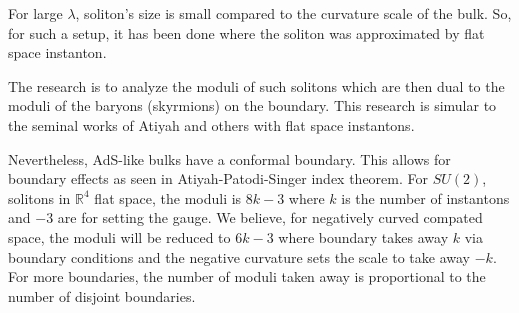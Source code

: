 \documentclass[12pt]{article}
\begin{document}
For large $\lambda$, soliton's size is small compared to the curvature scale of the bulk. 
So, for such a setup, it has been done where the soliton was approximated by flat space instanton.


The research is to analyze the moduli of such solitons which are then dual to the moduli of the baryons (skyrmions) on the boundary.
This research is simular to the seminal works of Atiyah and others with flat space instantons.

Nevertheless, AdS-like bulks have a conformal boundary. 
This allows for boundary effects as seen in Atiyah-Patodi-Singer index theorem.
For $SU(2)$, solitons in $\mathds{R}^4$ flat space, the moduli is $8k - 3$ where $k$ is the number of instantons and $-3$ are for setting the gauge.
We believe, for negatively curved compated space, the moduli will be reduced to $6k - 3$ where boundary takes away $k$ via boundary conditions and the negative curvature sets the scale to take away $-k$.
For more boundaries, the number of moduli taken away is proportional to the number of disjoint boundaries.

\end{document}
